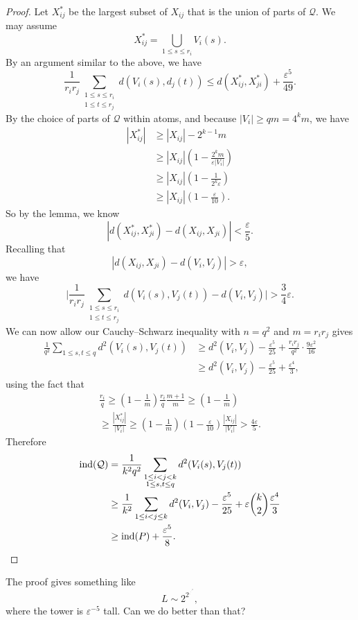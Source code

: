 \documentclass[a4paper]{article}
\newcommand\ind{\mathrm{ind}}
\begin{document}
\begin{proof}
  Let $X_{ij}^*$ be the largest subset of $X_{ij}$ that is the union of parts of $\mathcal{Q}$. We may assume
  \[
    X_{ij}^* = \bigcup_{1 \leq s \leq r_i} V_i(s).
  \]
  By an argument similar to the above, we have
  \[
    \frac{1}{r_i r_j} \sum_{\substack{1 \leq s \leq r_i\\ 1 \leq t \leq r_j}} d(V_i(s), d_j(t)) \leq d(X_{ij}^*, X_{ji}^*) + \frac{\varepsilon^5}{49}.
  \]
  By the choice of parts of $\mathcal{Q}$ within atoms, and because $|V_i| \geq qm = 4^k m$, we have
  \begin{align*}
    |X_{ij}^*| &\geq |X_{ij}| - 2^{k - 1}m \\
    &\geq |X_{ij}| \left(1 - \frac{2^k m}{\varepsilon |V_i|}\right) \\
    &\geq |X_{ij}| \left(1 - \frac{1}{2^k \varepsilon}\right)\\
    &\geq |X_{ij}| \left(1 - \frac{\varepsilon}{10}\right).
  \end{align*}
  So by the lemma, we know
  \[
    |d(X_{ij}^*, X_{ji}^*) - d(X_{ij}, X_{ji})| < \frac{\varepsilon}{5}.
  \]
  Recalling that
  \[
    |d(X_{ij}, X_{ji}) - d(V_i, V_j)| > \varepsilon,
  \]
  we have
  \[
    \bigg| \frac{1}{r_i r_j} \sum_{\substack{1 \leq s \leq r_i\\ 1 \leq t \leq r_j}} d(V_i(s), V_j(t)) - d(V_i, V_j)\bigg| > \frac{3}{4} \varepsilon.
  \]
  We can now allow our Cauchy--Schwarz inequality with $n = q^2$ and $m = r_i r_j$ gives
  \begin{align*}
    \frac{1}{q^2} \sum_{1 \leq s, t \leq q} d^2 (V_i(s), V_j(t)) &\geq d^2(V_i, V_j) - \frac{\varepsilon^5}{25} + \frac{r_i r_j}{q^2}\cdot \frac{9\varepsilon^2}{16} \\
    &\geq d^2(V_i, V_j) - \frac{\varepsilon^5}{25} + \frac{\varepsilon^4}{3},
  \end{align*}
  using the fact that
  \begin{multline*}
    \frac{r_i}{q} \geq \left(1 - \frac{1}{m}\right) \frac{r_i}{q} \frac{m + 1}{m} \geq \left(1 - \frac{1}{m}\right)\\ \geq \frac{|X_{ij}^*|}{|V_i|} \geq \left(1 - \frac{1}{m}\right) \left(1 - \frac{\varepsilon}{10}\right) \frac{|X_{ij}|}{|V_i|} > \frac{4\varepsilon}{5}.
  \end{multline*}
  Therefore
  \begin{align*}
    \ind(\mathcal{Q}) &= \frac{1}{k^2q^2}\sum_{\substack{1 \leq i < j < k\\ 1 \leq s, t\leq q}} d^2(V_i(s), V_j(t))\\
    &\geq \frac{1}{k^2} \sum_{1 \leq i < j \leq k} d^2(V_i, V_j) - \frac{\varepsilon^5}{25} + \varepsilon \binom{k}{2} \frac{\varepsilon^4}{3}\\
    &\geq \ind(P) + \frac{\varepsilon^5}{8}.\qedhere
  \end{align*}
\end{proof}
The proof gives something like
\[
  L \sim 2^{2^{.^{.^{.^{2}}}}},
\]
where the tower is $\varepsilon^{-5}$ tall. Can we do better than that?
\end{document}
